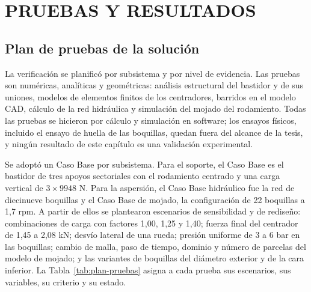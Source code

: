 \chapter{PRUEBAS Y RESULTADOS}
\label{cap:resultados}

\section{Plan de pruebas de la solución}
\label{sec:plan-pruebas}

La verificación se planificó por subsistema y por nivel de evidencia. Las pruebas son numéricas, analíticas y geométricas: análisis estructural del bastidor y de sus uniones, modelos de elementos finitos de los centradores, barridos en el modelo CAD, cálculo de la red hidráulica y simulación del mojado del rodamiento. Todas las pruebas se hicieron por cálculo y simulación en software; los ensayos físicos, incluido el ensayo de huella de las boquillas, quedan fuera del alcance de la tesis, y ningún resultado de este capítulo es una validación experimental.

Se adoptó un Caso Base por subsistema. Para el soporte, el Caso Base es el bastidor de tres apoyos sectoriales con el rodamiento centrado y una carga vertical de $3\times9948$ N. Para la aspersión, el Caso Base hidráulico fue la red de diecinueve boquillas y el Caso Base de mojado, la configuración de 22 boquillas a 1,7 rpm. A partir de ellos se plantearon escenarios de sensibilidad y de rediseño: combinaciones de carga con factores 1,00, 1,25 y 1,40; fuerza final del centrador de 1,45 a 2,08 kN; desvío lateral de una rueda; presión uniforme de 3 a 6 bar en las boquillas; cambio de malla, paso de tiempo, dominio y número de parcelas del modelo de mojado; y las variantes de boquillas del diámetro exterior y de la cara inferior. La Tabla~\ref{tab:plan-pruebas} asigna a cada prueba sus escenarios, sus variables, su criterio y su estado.

